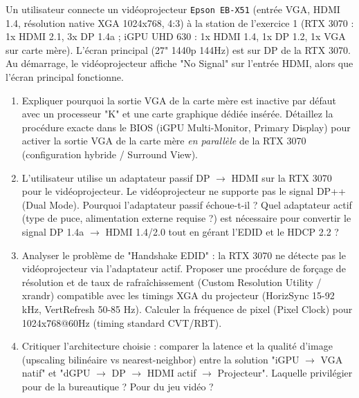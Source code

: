 \documentclass[11pt]{article}
\begin{document}
\begin{exercice}
Un utilisateur connecte un vidéoprojecteur \texttt{Epson EB-X51} (entrée VGA, HDMI 1.4, résolution native XGA 1024x768, 4:3) à la station de l'exercice 1 (RTX 3070 : 1x HDMI 2.1, 3x DP 1.4a ; iGPU UHD 630 : 1x HDMI 1.4, 1x DP 1.2, 1x VGA sur carte mère). L'écran principal (27" 1440p 144Hz) est sur DP de la RTX 3070. Au démarrage, le vidéoprojecteur affiche "No Signal" sur l'entrée HDMI, alors que l'écran principal fonctionne.
\begin{enumerate}
    \item Expliquer pourquoi la sortie VGA de la carte mère est inactive par défaut avec un processeur "K" et une carte graphique dédiée insérée. Détaillez la procédure exacte dans le BIOS (iGPU Multi-Monitor, Primary Display) pour activer la sortie VGA de la carte mère \textit{en parallèle} de la RTX 3070 (configuration hybride / Surround View).
    \item L'utilisateur utilise un adaptateur passif DP $\to$ HDMI sur la RTX 3070 pour le vidéoprojecteur. Le vidéoprojecteur ne supporte pas le signal DP++ (Dual Mode). Pourquoi l'adaptateur passif échoue-t-il ? Quel adaptateur actif (type de puce, alimentation externe requise ?) est nécessaire pour convertir le signal DP 1.4a $\to$ HDMI 1.4/2.0 tout en gérant l'EDID et le HDCP 2.2 ?
    \item Analyser le problème de "Handshake EDID" : la RTX 3070 ne détecte pas le vidéoprojecteur via l'adaptateur actif. Proposer une procédure de forçage de résolution et de taux de rafraîchissement (Custom Resolution Utility / xrandr) compatible avec les timings XGA du projecteur (HorizSync 15-92 kHz, VertRefresh 50-85 Hz). Calculer la fréquence de pixel (Pixel Clock) pour 1024x768@60Hz (timing standard CVT/RBT).
    \item Critiquer l'architecture choisie : comparer la latence et la qualité d'image (upscaling bilinéaire vs nearest-neighbor) entre la solution "iGPU $\to$ VGA natif" et "dGPU $\to$ DP $\to$ HDMI actif $\to$ Projecteur". Laquelle privilégier pour de la bureautique ? Pour du jeu vidéo ?
\end{enumerate}
\end{exercice}
\end{document}
